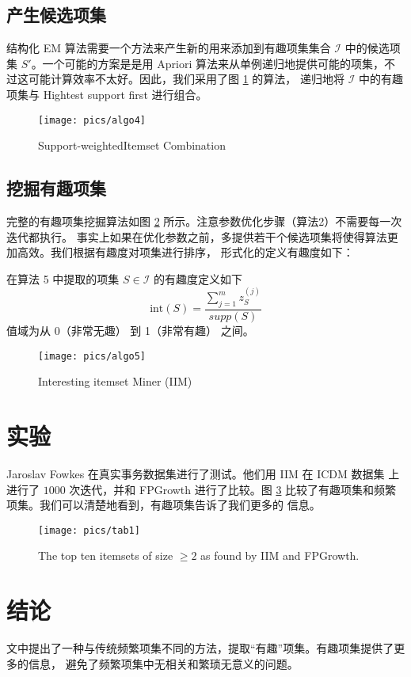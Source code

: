 \documentclass{ctexart}
\newcommand{\scri}[0]{\mathcal{I}}
\begin{document}
\subsection{产生候选项集}
结构化 EM 算法需要一个方法来产生新的用来添加到有趣项集集合 $\scri$ 中的候选项集 $S'$。一个可能的方案是是用
Apriori 算法来从单例递归地提供可能的项集，不过这可能计算效率不太好。因此，我们采用了图 \ref{fig:algo4} 的算法，
递归地将 $\scri$ 中的有趣项集与 Hightest support first 进行组合。

\begin{figure}
	\centering
	\texttt{[image: pics/algo4]}
	\caption{Support-weightedItemset Combination}
	\label{fig:algo4}
\end{figure}

\subsection{挖掘有趣项集}

完整的有趣项集挖掘算法如图 \ref{fig:algo5} 所示。注意参数优化步骤（算法2）不需要每一次迭代都执行。
事实上如果在优化参数之前，多提供若干个候选项集将使得算法更加高效。我们根据有趣度对项集进行排序，
形式化的定义有趣度如下：

在算法 5 中提取的项集 $S \in \scri$ 的有趣度定义如下
$$
\mathrm{int}(S) = \frac { \sum_{j=1}^{m} z_S^{(j)} }{ supp(S) }
$$
值域为从 0（非常无趣） 到 1（非常有趣） 之间。

\begin{figure}
	\centering
	\texttt{[image: pics/algo5]}
	\caption{Interesting itemset Miner (IIM)}
	\label{fig:algo5}
\end{figure}

\section{实验}
Jaroslav Fowkes 在真实事务数据集进行了测试。他们用 IIM 在 ICDM 数据集 \cite{DeBie} 上进行了 $1000$ 次迭代，并和
FPGrowth 进行了比较。图 \ref{fig:tab1} 比较了有趣项集和频繁项集。我们可以清楚地看到，有趣项集告诉了我们更多的
信息。

\begin{figure}
\centering
\texttt{[image: pics/tab1]}
\caption{The top ten itemsets of size $\ge 2$ as found by IIM and FPGrowth.}
\label{fig:tab1}
\end{figure}

\section{结论}
文中提出了一种与传统频繁项集不同的方法，提取“有趣”项集。有趣项集提供了更多的信息，
避免了频繁项集中无相关和繁琐无意义的问题。

\pagebreak

\end{document}

